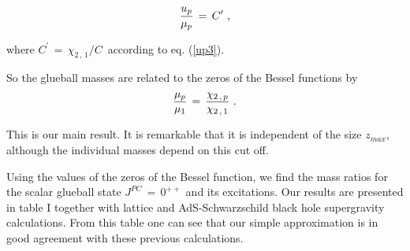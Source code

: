 \documentclass[a4paper,twocolumn,prl,groupedaddress,nofootinbib,showpacs]{revtex4}
\begin{document}
\begin{equation}
{u_p \over \mu_p }\,=\,C^\prime\,\,, 
\end{equation}
 
\noindent 
where $C^\prime \,=\, \chi_{2\,,\,1}/ C\,$ according to eq. (\ref{up3}).

So the glueball masses are related to the zeros of the Bessel
functions by
\begin{equation}
\label{QCD4}
{ \mu_p\over \mu_1 }\,=\,{\chi_{2\,,\,p}\over \chi_{2\,,\,1}}\,\,.
\end{equation}

\noindent This is our main result. It is remarkable that it is
independent of the size $z_{max}$, although the individual masses
depend on this cut off. 
 
Using the values of the zeros of the Bessel function, 
we find the mass ratios for the scalar glueball state 
$J^{PC}\,=\,0^{++}$ and its excitations. 
Our results are presented in table I together with lattice
\cite{LAT1,LAT2} and AdS-Schwarzschild black hole supergravity
\cite{MASSG} calculations. 
From this table one can see that our simple approximation is in good 
agreement with these previous calculations.
\end{document}
